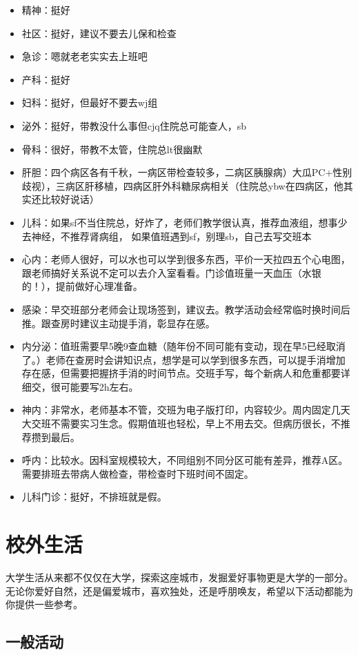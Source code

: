\documentclass[zihao=-4,fontset=none]{Beautybook-CN}
\begin{document}
\begin{itemize}
\item 精神：挺好
\item 社区：挺好，建议不要去儿保和检查
\item 急诊：嗯就老老实实去上班吧  
\item 产科：挺好
\item 妇科：挺好，但最好不要去wj组
\item 泌外：挺好，带教没什么事但cjq住院总可能查人，sb
\item 骨科：很好，带教不太管，住院总lt很幽默
\item 肝胆：四个病区各有千秋，一病区带检查较多，二病区胰腺病）大瓜PC+性别歧视），三病区肝移植，四病区肝外科糖尿病相关（住院总ybw在四病区，他其实还比较好说话）
\item 儿科：如果sf不当住院总，好炸了，老师们教学很认真，推荐血液组，想事少去神经，不推荐肾病组， 如果值班遇到sf，别理sb，自己去写交班本
\item 心内：老师人很好，可以水也可以学到很多东西，平价一天拉四五个心电图，跟老师搞好关系说不定可以去介入室看看。门诊值班量一天血压（水银的！），提前做好心理准备。
\item 感染：早交班部分老师会让现场签到，建议去。教学活动会经常临时换时间后推。跟查房时建议主动提手消，彰显存在感。
\item 内分泌：值班需要早5晚9查血糖（随年份不同可能有变动，现在早5已经取消了。）老师在查房时会讲知识点，想学是可以学到很多东西，可以提手消增加存在感，但需要把握挤手消的时间节点。交班手写，每个新病人和危重都要详细交，很可能要写2h左右。
\item 神内：非常水，老师基本不管，交班为电子版打印，内容较少。周内固定几天大交班不需要实习生念。假期值班也轻松，早上不用去交。但病历很长，不推荐攒到最后。
\item 呼内：比较水。因科室规模较大，不同组别不同分区可能有差异，推荐A区。需要排班去带病人做检查，带检查时下班时间不固定。
\item 儿科门诊：挺好，不排班就是假。
\end{itemize}
\chapter{校外生活}
大学生活从来都不仅仅在大学，探索这座城市，发掘爱好事物更是大学的一部分。无论你爱好自然，还是偏爱城市，喜欢独处，还是呼朋唤友，希望以下活动都能为你提供一些参考。

\section{一般活动}
\end{document}
